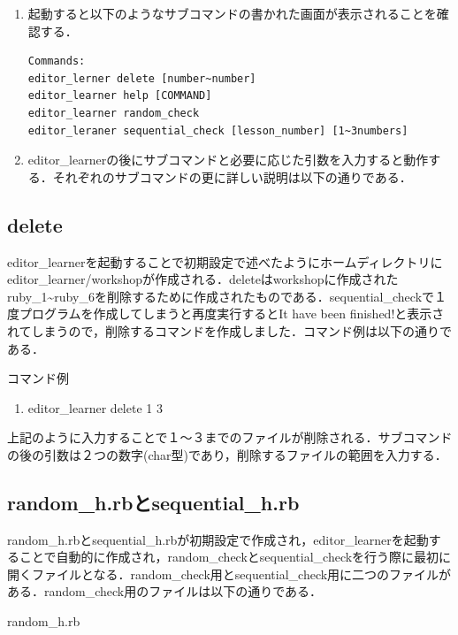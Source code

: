 \documentclass[11pt,dvipdfmx]{jsarticle}
\providecommand{\tightlist}{%
      \setlength{\itemsep}{0pt}\setlength{\parskip}{0pt}}
\begin{document}
\begin{enumerate}
\def\labelenumi{\arabic{enumi}.}
\item
  起動すると以下のようなサブコマンドの書かれた画面が表示されることを確認する．

\begin{verbatim}
Commands:
editor_lerner delete [number~number]
editor_learner help [COMMAND]
editor_learner random_check
editor_leraner sequential_check [lesson_number] [1~3numbers]
\end{verbatim}
\item
  editor\_learnerの後にサブコマンドと必要に応じた引数を入力すると動作する．それぞれのサブコマンドの更に詳しい説明は以下の通りである．
\end{enumerate}

    \subsection{delete}\label{delete}

    editor\_learnerを起動することで初期設定で述べたようにホームディレクトリにeditor\_learner/workshopが作成される．deleteはworkshopに作成されたruby\_1\textasciitilde{}ruby\_6を削除するために作成されたものである．sequential\_checkで１度プログラムを作成してしまうと再度実行するとIt
have been
finished!と表示されてしまうので，削除するコマンドを作成しました．コマンド例は以下の通りである．

コマンド例

\begin{enumerate}
\def\labelenumi{\arabic{enumi}.}
\tightlist
\item
  editor\_learner delete 1 3
\end{enumerate}

上記のように入力することで１〜３までのファイルが削除される．サブコマンドの後の引数は２つの数字(char型)であり，削除するファイルの範囲を入力する．

    \subsection{random\_h.rbとsequential\_h.rb}\label{random_h.rbux3068sequential_h.rb}

random\_h.rbとsequential\_h.rbが初期設定で作成され，editor\_learnerを起動することで自動的に作成され，random\_checkとsequential\_checkを行う際に最初に開くファイルとなる．random\_check用とsequential\_check用に二つのファイルがある．random\_check用のファイルは以下の通りである．

random\_h.rb
\end{document}
